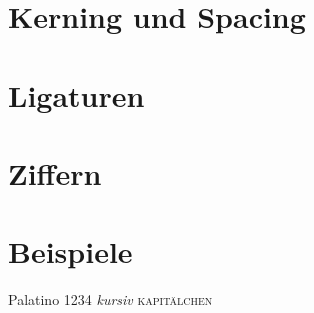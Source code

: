 \section{Kerning und Spacing}
\label{sec:KernSpace}


\section{Ligaturen}



\section{Ziffern}
\label{sec:Ziffern}


\section{Beispiele}

{\selectfont Palatino 1234 \emph{kursiv} \textsc{kapitälchen}}


